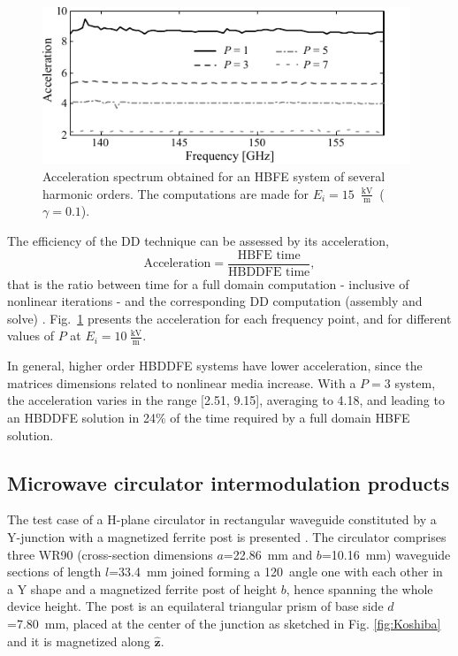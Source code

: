 \begin{figure}[!ht]
\centering
\includegraphics[width=11cm]{acceleration}
\caption{Acceleration spectrum obtained for an HBFE system of several harmonic
orders. The computations are made for $E_i = 15$~${\frac{\mathrm{kV}}{\mathrm{m}}}$~($\gamma = 0.1$).}
\label{fig:acceleration}
\end{figure}

The efficiency of the DD technique can be
assessed by its acceleration,
$$\text{Acceleration} = \frac{\text{HBFE time}}{\text{HBDDFE time}},$$
\noindent that is the ratio between time for a full domain
computation - inclusive of nonlinear iterations - and the corresponding DD
computation (assembly and solve) \cite{Guarnieri2010}. Fig.~\ref{fig:acceleration} presents the acceleration for each frequency point, and for different values of $P$ at  $E_i = 10~{\frac{\mathrm{kV}}{\mathrm{m}}}$. 

In general, higher order HBDDFE systems have lower acceleration, since the
matrices dimensions related to nonlinear media increase. With a
$P=3$ system, the acceleration varies in the range [2.51,
9.15], averaging to 4.18, and leading to an HBDDFE solution in 24\% of the
time required by a full domain HBFE solution.

\subsection{Microwave circulator intermodulation products}


The test case of a H-plane circulator in rectangular waveguide constituted by a Y-junction with a magnetized ferrite post is presented \cite{koshiba1986finite}. The circulator comprises three WR90 (cross-section dimensions $a$=22.86~mm and $b$=10.16~mm) waveguide sections of length $l$=33.4~mm joined forming a 120\textdegree~angle one with each other in a Y shape and a magnetized ferrite post of height $b$, hence spanning the whole device height. The post is an equilateral triangular prism of base side $d$=7.80~mm, placed at the center of the junction as sketched in Fig. \ref{fig:Koshiba} and it is magnetized along $\hat{\mathbf{z}}$.


